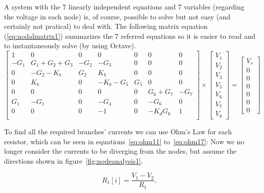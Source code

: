 A system with the 7 linearly independent equations and 7 variables (regarding the voltage in each node) is, of course, possible to solve but not easy (and certainly not pratical) to deal with. The following matrix equation (\ref{eq:nodalmatrix1}) summarizes the 7 referred equations so it is easier to read and to instantaneously solve (by using Octave).
\begin{equation}
\left[ \begin{array}{ccccccc} 
		1 & 0 & 0 & 0 & 0 & 0 & 0 \\ 
		-G_1 & G_1+G_2+G_3 & -G_2 & -G_3 & 0 & 0 & 0 \\
		0 & -G_2-K_b & G_2 & K_b & 0 & 0 & 0 \\ 
		0 & K_b & 0 & -K_b-G_5 & G_5 & 0 & 0  \\ 
		0 & 0 & 0 & 0 & 0 & G_6+G_7 & -G_7  \\ 
		G_1 & -G_1 & 0 & -G_4 & 0 & -G_6 & 0  \\ 
		0 & 0 & 0 & -1 & 0 & -K_dG_6 & 1 \\ 

\end{array} \right]
\times \left[ \begin{array}{c} V_1 \\ V_2 \\ V_3 \\ V_5 \\ V_6 \\ V_7 \\ V_8 \end{array} \right] =
\left[ \begin{array}{c} V_s \\ 0 \\ 0 \\ 0 \\ 0 \\ 0 \\ 0  \end{array} \right]
\label{eq:nodalmatrix1}
\end{equation}

To find all the required branches' currents we can use Ohm's Law for each resistor, which can be seen in equations~\ref{eq:ohm11} to~\ref{eq:ohm17}: Now we no longer consider the currents to be diverging from the nodes, but assume the directions shown in figure~\ref{fig:nodeanalysis1}.


\begin{equation}
  R_1[i] = \frac{V_1 - V_2}{R_1},
  \label{eq:ohm11}
\end{equation}

